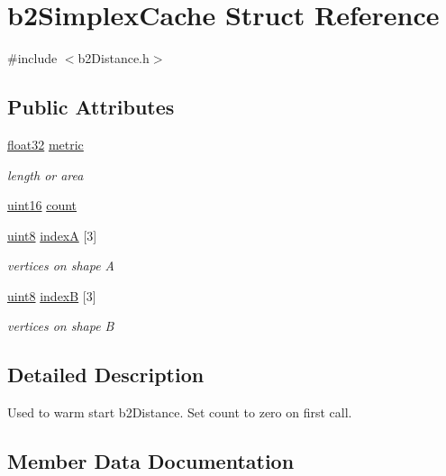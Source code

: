 \hypertarget{structb2_simplex_cache}{}\section{b2\+Simplex\+Cache Struct Reference}
\label{structb2_simplex_cache}


{\ttfamily \#include $<$b2\+Distance.\+h$>$}

\subsection*{Public Attributes}
\begin{DoxyCompactItemize}
\item 
\mbox{\hyperlink{b2_settings_8h_aacdc525d6f7bddb3ae95d5c311bd06a1}{float32}} \mbox{\hyperlink{structb2_simplex_cache_a018e0a500b417d79bfed3f21310b15a2}{metric}}
\begin{DoxyCompactList}\small\item\em length or area \end{DoxyCompactList}\item 
\mbox{\hyperlink{b2_settings_8h_a05f6b0ae8f6a6e135b0e290c25fe0e4e}{uint16}} \mbox{\hyperlink{structb2_simplex_cache_a5ef63839988cc06210ae76bcef96f56c}{count}}
\item 
\mbox{\hyperlink{b2_settings_8h_adde6aaee8457bee49c2a92621fe22b79}{uint8}} \mbox{\hyperlink{structb2_simplex_cache_ab574159e69dda7e14ead8de848ca6b67}{indexA}} \mbox{[}3\mbox{]}
\begin{DoxyCompactList}\small\item\em vertices on shape A \end{DoxyCompactList}\item 
\mbox{\hyperlink{b2_settings_8h_adde6aaee8457bee49c2a92621fe22b79}{uint8}} \mbox{\hyperlink{structb2_simplex_cache_ab7586465ee2c5f7c3bdd8f80d5e256a7}{indexB}} \mbox{[}3\mbox{]}
\begin{DoxyCompactList}\small\item\em vertices on shape B \end{DoxyCompactList}\end{DoxyCompactItemize}


\subsection{Detailed Description}
Used to warm start b2\+Distance. Set count to zero on first call. 

\subsection{Member Data Documentation}
\mbox{\label{structb2_simplex_cache_a5ef63839988cc06210ae76bcef96f56c}} 
